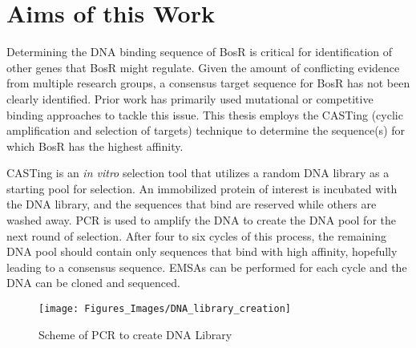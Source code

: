 \documentclass[12pt,twoside]{reedthesis}
\begin{document}
	
	
	
	
		 
		  
\section*{Aims of this Work}

Determining the DNA binding sequence of BosR is critical for identification of other genes that BosR might regulate. 	 Given the amount of conflicting evidence from multiple research groups, a consensus target sequence for BosR has not been clearly identified. Prior work has primarily used mutational or competitive binding approaches to tackle this issue. This thesis employs the CASTing (cyclic amplification and selection of targets) technique to determine the sequence(s) for which BosR has the highest affinity. 


CASTing is an \textit{in vitro} selection tool that utilizes a random DNA library as a starting pool for selection. An immobilized protein of interest is incubated with the DNA library, and the sequences that bind are reserved while others are washed away. PCR is used to amplify the DNA to create the DNA pool for the next round of selection. After four to six cycles of this process, the remaining DNA pool should contain only sequences that bind with high affinity, hopefully leading to a consensus sequence. EMSAs can be performed for each cycle and the DNA  can be cloned and sequenced. 
		 	 	\begin{figure}[h]
		 	 		
		 	 		\centering
		 	 		\texttt{[image: Figures\_Images/DNA\_library\_creation]}
		 	 		\caption[DNA Library Creation]{Scheme of PCR to create DNA Library}
		 	 		\label{DNALibrary}
		 	 	\end{figure}
		 	 	
\end{document}
